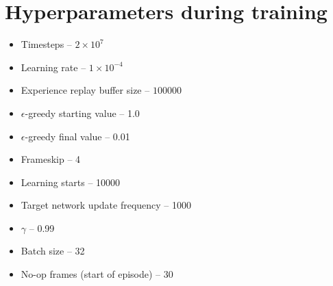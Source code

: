 \chapter{Hyperparameters during training}
\label{appen:train}

\begin{itemize}
  \item Timesteps -- $2 \times 10^{7}$
  \item Learning rate -- $1 \times 10^{-4}$
  \item Experience replay buffer size -- $100000$
  \item $\epsilon$-greedy starting value -- 1.0
  \item $\epsilon$-greedy final value -- 0.01
  \item Frameskip -- 4
  \item Learning starts -- 10000
  \item Target network update frequency -- 1000
  \item $\gamma$ -- 0.99
  \item Batch size -- 32
  \item No-op frames (start of episode) -- 30
\end{itemize}
